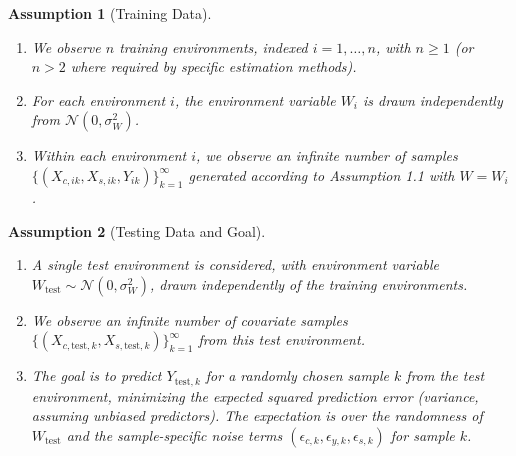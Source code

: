 \documentclass[11pt]{article}
\newtheorem{assumption}{Assumption}[section]
\newcommand{\N}{\mathcal{N}}
\begin{document}
\begin{assumption}[Training Data]
\begin{enumerate}
    \item We observe $n$ training environments, indexed $i=1, \dots, n$, with $n \ge 1$ (or $n>2$ where required by specific estimation methods).
    \item For each environment $i$, the environment variable $W_i$ is drawn independently from $\N(0, \sigma_W^2)$.
    \item Within each environment $i$, we observe an infinite number of samples $\{(X_{c,ik}, X_{s,ik}, Y_{ik})\}_{k=1}^\infty$ generated according to Assumption 1.1 with $W=W_i$.
\end{enumerate}
\end{assumption}

\begin{assumption}[Testing Data and Goal]
\begin{enumerate}
    \item A single test environment is considered, with environment variable $W_{\text{test}} \sim \N(0, \sigma_W^2)$, drawn independently of the training environments.
    \item We observe an infinite number of covariate samples $\{(X_{c,\text{test},k}, X_{s,\text{test},k})\}_{k=1}^\infty$ from this test environment.
    \item The goal is to predict $Y_{\text{test},k}$ for a randomly chosen sample $k$ from the test environment, minimizing the expected squared prediction error (variance, assuming unbiased predictors). The expectation is over the randomness of $W_{\text{test}}$ and the sample-specific noise terms $(\epsilon_{c,k}, \epsilon_{y,k}, \epsilon_{s,k})$ for sample $k$.
\end{enumerate}
\end{assumption}
\end{document}

